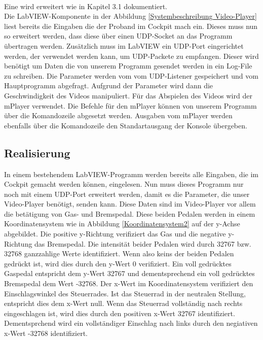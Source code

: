 \\
Eine wird erweitert wie in Kapitel 3.1 dokumentiert. 
\\
Die LabVIEW-Komponente in der Abbildung \ref{Systembeschreibung Video-Player} liest bereits die Eingaben die der Proband im Cockpit mach ein. Dieses muss nun so erweitert werden, dass diese über einen UDP-Socket an das Programm übertragen werden. Zusätzlich muss im LabVIEW ein UDP-Port eingerichtet werden, der verwendet werden kann, um UDP-Packete zu empfangen. Dieser wird benötigt um Daten die von unserem Programm gesendet werden in ein Log-File zu schreiben.
Die Parameter werden vom vom UDP-Listener gespeichert und vom Hauptprogramm abgefragt. Aufgrund der Parameter wird dann die Geschwindigkeit des Videos manipuliert. Für das Abspielen des Videos wird der mPlayer verwendet. Die Befehle für den mPlayer können von unserem Programm über die Komandozeile abgesetzt werden. Ausgaben vom mPlayer  werden ebenfalls über die Komandozeile den Standartausgang der Konsole übergeben. 

\subsection{Realisierung}
In einem bestehendem LabVIEW-Programm werden bereits alle Eingaben, die im Cockpit gemacht werden können, eingelesen. Nun muss dieses Programm nur noch mit einem UDP-Port erweitert werden, damit es die Parameter, die unser Video-Player benötigt, senden kann. Diese Daten sind im Video-Player vor allem die betätigung von Gas- und Bremspedal. Diese beiden Pedalen werden in einem Koordinatensystem wie in Abbildung \ref{Koordinatensystem2} auf der y-Achse abgebildet. Die positive y-Richtung verifiziert das Gas und die negative y-Richtung das Bremspedal. Die intensität beider Pedalen wird durch 32767 bzw. 32768 ganzzahlige Werte identifiziert. Wenn also keins der beiden Pedalen gedrückt ist, wird dies durch den y-Wert 0 verifiziert. Ein voll gedrücktes Gaspedal entspricht dem y-Wert 32767 und dementsprechend ein voll gedrücktes Bremspedal dem Wert -32768. Der x-Wert im Koordinatensystem verifiziert den Einschlagswinkel des Steuerrades. Ist das Steuerrad in der neutralen Stellung, entspricht dies dem x-Wert null. Wenn das Steuerrad vollständig nach rechts eingeschlagen ist, wird dies durch den positiven x-Wert 32767 identifiziert. Dementsprchend wird ein vollständiger Einschlag nach links durch den negiativen x-Wert -32768 identifiziert. \\

